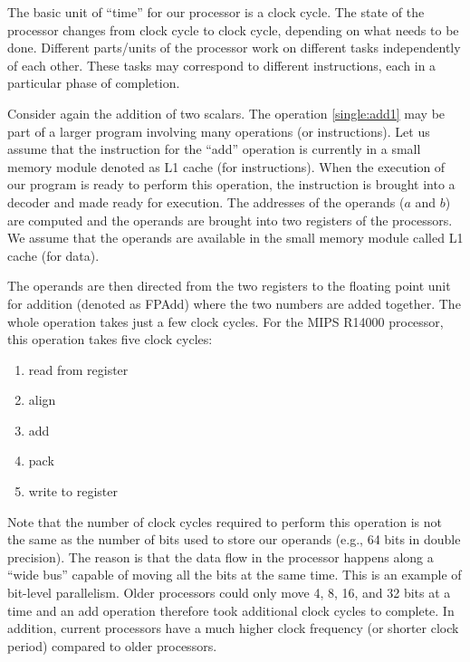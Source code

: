 The basic unit of ``time'' for our processor is a clock cycle. The state of the
processor changes from clock cycle to clock cycle, depending on what needs to be
done. Different parts/units of the processor work on different tasks
independently of each other. These tasks may correspond to different
instructions, each in a particular phase of completion.

Consider again the addition of two scalars. The operation \eqref{single:add1}
may be part of a larger program involving many operations (or instructions). Let
us assume that the instruction for the ``add'' operation is currently in a small
memory module denoted as L1 cache (for instructions). When the execution of our
program is ready to perform this operation, the instruction is brought into a
decoder and made ready for execution. The addresses of the operands ($a$ and
$b$) are computed and the operands are brought into two registers of the
processors. We assume that the operands are available in the small memory module
called L1 cache (for data).

The operands are then directed from the two registers to the floating point unit
for addition (denoted as FPAdd) where the two numbers are added together. The
whole operation takes just a few clock cycles. For the MIPS R14000 processor,
this operation takes five clock cycles:
\begin{enumerate}
\item read from register
\item align
\item add
\item pack
\item write to register
\end{enumerate}
Note that the number of clock cycles required to perform this operation is not
the same as the number of bits used to store our operands (e.g., 64 bits in
double precision). The reason is that the data flow in the processor happens
along a ``wide bus'' capable of moving all the bits at the same time. This is an
example of bit-level parallelism. Older processors could only move 4, 8, 16, and
32 bits at a time and an add operation therefore took additional clock cycles to
complete. In addition, current processors have a much higher clock frequency (or
shorter clock period) compared to older processors.

